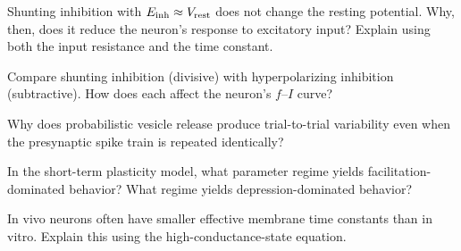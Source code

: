 \begin{conceptquestions}
  \item Shunting inhibition with $E_{\mathrm{\text{inh}}} \approx V_{\text{rest}}$ does not change the resting potential. Why, then, does it reduce the neuron's response to excitatory input? Explain using both the input resistance and the time constant.

  \item Compare shunting inhibition (divisive) with hyperpolarizing inhibition (subtractive). How does each affect the neuron's $f$--$I$ curve?

  \item Why does probabilistic vesicle release produce trial-to-trial variability even when the presynaptic spike train is repeated identically?

  \item In the short-term plasticity model, what parameter regime yields facilitation-dominated behavior? What regime yields depression-dominated behavior?

  \item In vivo neurons often have smaller effective membrane time constants than in vitro. Explain this using the high-conductance-state equation.
\end{conceptquestions}
